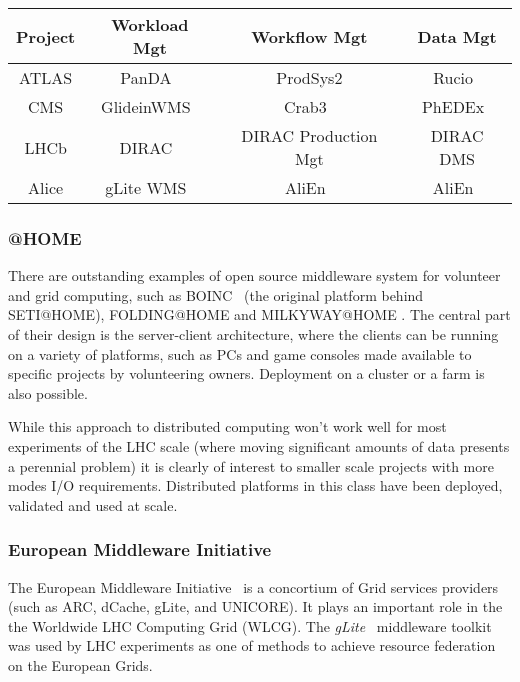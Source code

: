 \begin{center}
  \begin{tabular}{ c | c | c | c }
    \hline
    \textbf{Project} & \textbf{Workload Mgt} & \textbf{Workflow Mgt} & \textbf{Data Mgt}\\ \hline \hline
    ATLAS & PanDA~\cite{panda_chep10} & ProdSys2 & Rucio~\cite{rucio_chep13}\\ \hline
    CMS  & GlideinWMS~\cite{glideinwms} & Crab3~\cite{crab3_chep12} & PhEDEx~\cite{phedex_chep09,phedex_chep10}\\ \hline
    LHCb  & DIRAC~\cite{dirac_acat09}  & DIRAC Production Mgt & DIRAC DMS\\ \hline
    Alice  & gLite WMS~\cite{glite_chep09} & AliEn~\cite{alien_chep07} & AliEn~\cite{alien_chep07}\\ 
    \hline
  \end{tabular}
\end{center}

\subsubsection{@HOME}
\label{at_home}
There are outstanding examples of open source middleware system for volunteer and grid computing, such as BOINC~\cite{boinc} (the original platform behind SETI@HOME),
FOLDING@HOME and MILKYWAY@HOME \cite{mwathome}. The central part of their design is the server-client architecture, where the clients can be running on a variety of platforms,
such as PCs and game consoles made available to specific projects by volunteering owners. Deployment on a cluster or a farm is also possible.

While this approach to distributed computing won't work well for most experiments of the LHC scale (where moving significant amounts of data presents a perennial problem)
it is clearly of interest to smaller scale projects with more modes I/O requirements. Distributed platforms in this class have been deployed, validated and used at scale.

\subsubsection{European Middleware Initiative}
The European Middleware Initiative~\cite{emi} is a concortium of Grid services providers (such as ARC, dCache, gLite, and UNICORE).
It plays an important role in the the Worldwide LHC Computing Grid (WLCG). The \textit{gLite}~\cite{glite_chep09} middleware toolkit was used by LHC experiments as one of methods
to achieve resource federation on the European Grids. 


